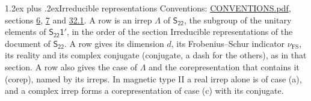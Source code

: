 \documentclass[10pt,a4paper]{article}
\makeatletter
\renewcommand\section{\@startsection{section}{1}{\z@}{-3ex plus -1ex minus -.2ex}%
  {1.2ex plus .2ex}{\normalfont\large\sffamily\bfseries\color{parttitle}}}
\numberwithin{equation}{section}
\newcommand{\grp}[1]{\mathsf{#1}}
\newcommand{\fsind}{\nu_{\mathrm{FS}}}
\makeatother
\begin{document}
\section{Irreducible representations}\label{s:irreps}
Conventions: \href{../../CONVENTIONS.pdf}{CONVENTIONS.pdf}, sections \href{../../../rotation/CONVENTIONS.pdf\#conv.6}{6}, \href{../../../rotation/CONVENTIONS.pdf\#conv.7}{7} and \href{../../CONVENTIONS.pdf\#conv.32.1}{32.1}.
\leavevmode\label{n:irrep.Delta}A row is an irrep $\Lambda$ of $\grp{S_{22}}$, the subgroup of the unitary elements of $\grp{S_{22}1'}$, in the order of the section Irreducible representations of the document of \href{../../../rotation/data/pdf/S22.pdf}{$\grp{S_{22}}$}. \label{n:index.dimension}\label{n:index.frobenius}\label{n:head.irrep}\label{n:head.reality}\label{n:head.conjugate}A row gives its dimension $d$, its Frobenius--Schur indicator $\fsind$, its reality and its complex conjugate (conjugate, a dash for the others), as in that section. \label{n:head.case.corep}\label{n:head.corep}A row also gives the case of $\Lambda$ and the corepresentation that contains it (corep), named by its irreps. In magnetic type II a real irrep alone is of case (a), and a complex irrep forms a corepresentation of case (c) with its conjugate.
\setlength{\emergencystretch}{2em}\par\setlength{\emergencystretch}{0pt}
\end{document}
